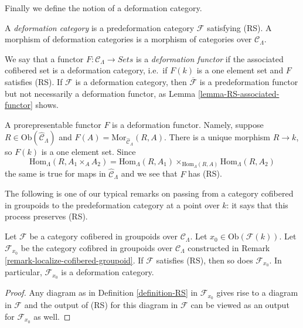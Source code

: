 \noindent
Finally we define the notion of a deformation category.

\begin{definition}
\label{definition-deformation-category}
A {\it deformation category} is a predeformation category $\mathcal{F}$ 
satisfying (RS). A morphism of deformation categories is a morphism of 
categories over $\mathcal{C}_\Lambda$.
\end{definition}

\begin{remark}
\label{remark-deformation-functor}
We say that a functor $F: \mathcal{C}_\Lambda \to \textit{Sets}$ 
is a {\it deformation functor} if the associated cofibered set is a 
deformation category, i.e.\ if $F(k)$ is a one element set and $F$ satisfies 
(RS). If $\mathcal{F}$ is a deformation category, then
$\overline{\mathcal{F}}$ 
is a predeformation functor but not necessarily a deformation functor, as
Lemma \ref{lemma-RS-associated-functor} shows.
\end{remark}

\begin{example}
\label{example-prorepresentable-deformation-functor}
A prorepresentable functor $F$ is a deformation functor. Namely, suppose
$R \in \text{Ob}(\widehat{\mathcal{C}}_\Lambda)$ and
$F(A) = \text{Mor}_{\widehat{\mathcal{C}}_\Lambda}(R, A)$.
There is a unique morphism $R \to k$, so $F(k)$ is a one element set.
Since
$$
\text{Hom}_\Lambda(R, A_1 \times_A A_2) =
\text{Hom}_\Lambda(R, A_1) \times_{\text{Hom}_\Lambda(R, A)}
\text{Hom}_\Lambda(R, A_2)
$$
the same is true for maps in $\widehat{\mathcal{C}}_\Lambda$ and
we see that $F$ has (RS).
\end{example}

\noindent
The following is one of our typical remarks on passing from a category 
cofibered in groupoids to the predeformation category at a point over $k$: it 
says that this process preserves (RS).

\begin{lemma}
\label{lemma-localize-RS}
Let $\mathcal{F}$ be a category cofibered in groupoids over
$\mathcal{C}_\Lambda$. Let $x_0 \in \text{Ob}(\mathcal{F}(k))$.
Let $\mathcal{F}_{x_0}$ be the category cofibred in groupoids over
$\mathcal{C}_\Lambda$ constructed in
Remark \ref{remark-localize-cofibered-groupoid}.
If $\mathcal{F}$ satisfies (RS), then so does $\mathcal{F}_{x_0}$.
In particular, $\mathcal{F}_{x_0}$ is a deformation category.
\end{lemma}

\begin{proof}
Any diagram as in
Definition \ref{definition-RS}
in $\mathcal{F}_{x_0}$ gives rise to a diagram in $\mathcal{F}$
and the output of (RS) for this diagram in $\mathcal{F}$
can be viewed as an output for $\mathcal{F}_{x_0}$ as well.
\end{proof}

